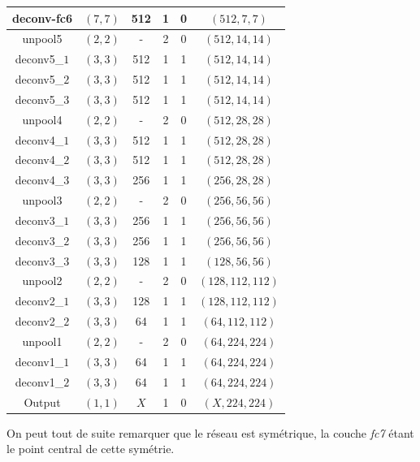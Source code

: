 \documentclass[a4paper, 11pt]{report}
\begin{document}
\begin{center}
\begin{tabular}{|c|c|c|c|c|c|}
	deconv-fc6 & $(7, 7)$ & 512 & 1 & 0 & $(512, 7, 7)$ \\
	\hline
	unpool5 & $(2, 2)$ & - & 2 & 0 & $(512, 14, 14)$ \\
	\hline
	deconv5\_$1$ & $(3, 3)$ & 512 & 1 & 1 & $(512, 14, 14)$ \\
	\hline
	deconv5\_$2$ & $(3, 3)$ & 512 & 1 & 1 & $(512, 14, 14)$ \\
	\hline
	deconv5\_$3$ & $(3, 3)$ & 512 & 1 & 1 & $(512, 14, 14)$ \\
	\hline
	unpool4 & $(2, 2)$ & - & 2 & 0 & $(512, 28, 28)$ \\
	\hline
	deconv4\_$1$ & $(3, 3)$ & 512 & 1 & 1 & $(512, 28, 28)$ \\
	\hline
	deconv4\_$2$ & $(3, 3)$ & 512 & 1 & 1 & $(512, 28, 28)$ \\
	\hline
	deconv4\_$3$ & $(3, 3)$ & 256 & 1 & 1 & $(256, 28, 28)$ \\
	\hline
	unpool3 & $(2, 2)$ & - & 2 & 0 & $(256, 56, 56)$ \\
	\hline
	deconv3\_$1$ & $(3, 3)$ & 256 & 1 & 1 & $(256, 56, 56)$ \\
	\hline
	deconv3\_$2$ & $(3, 3)$ & 256 & 1 & 1 & $(256, 56, 56)$ \\
	\hline
	deconv3\_$3$ & $(3, 3)$ & 128 & 1 & 1 & $(128, 56, 56)$ \\
	\hline
	unpool2 & $(2, 2)$ & - & 2 & 0 & $(128, 112, 112)$ \\
	\hline
	deconv2\_$1$ & $(3, 3)$ & 128 & 1 & 1 & $(128, 112, 112)$ \\
	\hline
	deconv2\_$2$ & $(3, 3)$ & 64 & 1 & 1 & $(64, 112, 112)$ \\
	\hline
	unpool1 & $(2, 2)$ & - & 2 & 0 & $(64, 224, 224)$ \\
	\hline
	deconv1\_$1$ & $(3, 3)$ & 64 & 1 & 1 & $(64, 224, 224)$ \\
	\hline
	deconv1\_$2$ & $(3, 3)$ & 64 & 1 & 1 & $(64, 224, 224)$ \\
	\hline
	Output & $(1, 1)$ & $X$ & 1 & 0 & $(X, 224, 224)$ \\
	\hline
	\end{tabular} 
\end{center}
On peut tout de suite remarquer que le réseau est symétrique, la couche \emph{fc7} étant le point central de cette symétrie.
\end{document}
